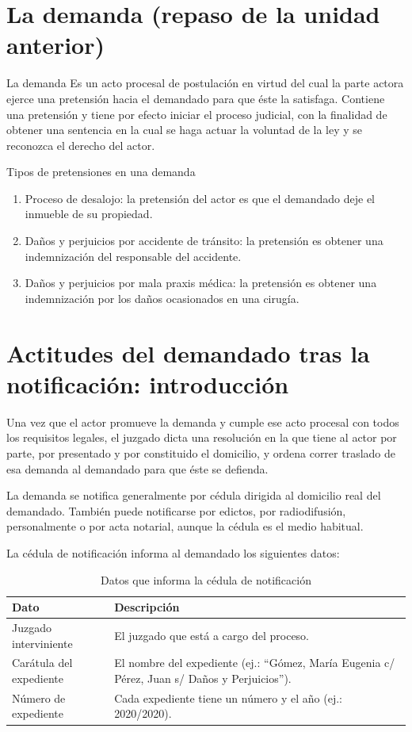 \documentclass[12pt,oneside]{book}
\begin{document}
\section{La demanda (repaso de la unidad anterior)}

\begin{definition}{La demanda}
Es un acto procesal de postulación en virtud del cual la parte actora ejerce una pretensión hacia el demandado para que éste la satisfaga. Contiene una pretensión y tiene por efecto iniciar el proceso judicial, con la finalidad de obtener una sentencia en la cual se haga actuar la voluntad de la ley y se reconozca el derecho del actor.
\end{definition}

\begin{example}{Tipos de pretensiones en una demanda}
\begin{enumerate}
    \item Proceso de desalojo: la pretensión del actor es que el demandado deje el inmueble de su propiedad.
    \item Daños y perjuicios por accidente de tránsito: la pretensión es obtener una indemnización del responsable del accidente.
    \item Daños y perjuicios por mala praxis médica: la pretensión es obtener una indemnización por los daños ocasionados en una cirugía.
\end{enumerate}
\end{example}

\section{Actitudes del demandado tras la notificación: introducción}

Una vez que el actor promueve la demanda y cumple ese acto procesal con todos los requisitos legales, el juzgado dicta una resolución en la que tiene al actor por parte, por presentado y por constituido el domicilio, y ordena correr traslado de esa demanda al demandado para que éste se defienda.

La demanda se notifica generalmente por cédula dirigida al domicilio real del demandado. También puede notificarse por edictos, por radiodifusión, personalmente o por acta notarial, aunque la cédula es el medio habitual.

La cédula de notificación informa al demandado los siguientes datos:

\begin{table}[H]
\centering
\caption{Datos que informa la cédula de notificación}
\begin{tabularx}{\textwidth}{l X}
\toprule
\textbf{Dato} & \textbf{Descripción} \\
\midrule
Juzgado interviniente & El juzgado que está a cargo del proceso. \\
Carátula del expediente & El nombre del expediente (ej.: ``Gómez, María Eugenia c/ Pérez, Juan s/ Daños y Perjuicios''). \\
Número de expediente & Cada expediente tiene un número y el año (ej.: 2020/2020). \\
\bottomrule
\end{tabularx}
\end{table}
\end{document}
